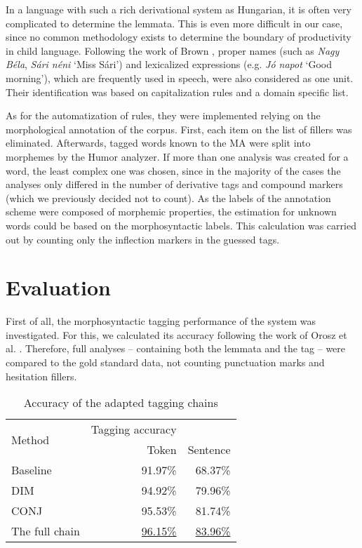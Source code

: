 In a language with such a rich derivational system as Hungarian, it is often very complicated to determine the lemmata. This is even more difficult in our case, since no common methodology exists to determine the boundary of productivity in child language. Following the work of Brown \cite{Brown1973}, proper names (such as \textit{Nagy Béla}, \textit{Sári néni} `Miss Sári’) and lexicalized expressions (e.g. \textit{Jó napot} `Good morning’), which are frequently used in speech, were also considered as one unit. Their identification was based on capitalization rules and a domain specific list.

As for the automatization of rules, they were implemented relying on the morphological annotation of the corpus. 
First, each item on the list of fillers was eliminated.
Afterwards, tagged words known to the MA were split into morphemes by the Humor analyzer. 
If more than one analysis was created for a word, the least complex one was chosen, since in the majority of the cases the analyses only differed in the number of derivative tags and compound markers (which we previously decided not to count). 
As the labels of the annotation scheme were composed of morphemic properties, the estimation for unknown words could be based on the morphosyntactic labels. This calculation was carried out by counting only the inflection markers in the guessed tags. 

\section{Evaluation}

First of all, the morphosyntactic tagging performance of the system was investigated. For this, we calculated its accuracy following the work of Orosz et al. \cite{Orosz2013}. Therefore, full analyses -- containing both the lemmata and the tag -- were compared to the gold standard data, not counting punctuation marks and hesitation fillers.

\begin{table}
\centering
\caption{Accuracy of the adapted tagging chains}
\label{tab:eval_tag}
\begin{tabular}{ l r r} 
\hline
\multicolumn{1}{l}{\multirow{2}{*}{Method}} & Tagging accuracy \\
& Token &  Sentence \\
\hline
Baseline & \hspace{1cm} 91.97\%  & \hspace{1cm} 68.37\% \\
DIM &  94.92\% & 79.96\% \\
CONJ & 95.53\% & 81.74\% \\
The full chain & \underline{96.15\%} & \underline{83.96\%} \\

\hline
\end{tabular}
\end{table}

